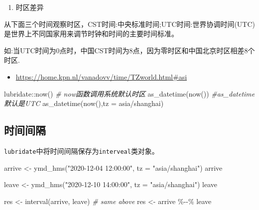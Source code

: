 \documentclass[
]{book}
\newenvironment{Shaded}{\begin{snugshade}}{\end{snugshade}}
\newcommand{\AttributeTok}[1]{\textcolor[rgb]{0.77,0.63,0.00}{#1}}
\newcommand{\CommentTok}[1]{\textcolor[rgb]{0.56,0.35,0.01}{\textit{#1}}}
\newcommand{\FunctionTok}[1]{\textcolor[rgb]{0.00,0.00,0.00}{#1}}
\newcommand{\NormalTok}[1]{#1}
\newcommand{\OtherTok}[1]{\textcolor[rgb]{0.56,0.35,0.01}{#1}}
\newcommand{\SpecialCharTok}[1]{\textcolor[rgb]{0.00,0.00,0.00}{#1}}
\newcommand{\StringTok}[1]{\textcolor[rgb]{0.31,0.60,0.02}{#1}}
\providecommand{\tightlist}{%
  \setlength{\itemsep}{0pt}\setlength{\parskip}{0pt}}
\begin{document}
\begin{enumerate}
\def\labelenumi{\arabic{enumi}.}
\setcounter{enumi}{2}
\tightlist
\item
  时区差异
\end{enumerate}

从下面三个时间观察时区，CST时间:中央标准时间;UTC时间:世界协调时间(UTC)是世界上不同国家用来调节时钟和时间的主要时间标准。

如:当UTC时间为0点时，中国CST时间为8点，因为零时区和中国北京时区相差8个时区.

\begin{itemize}
\tightlist
\item
  \url{https://home.kpn.nl/vanadovv/time/TZworld.html\#asi}
\end{itemize}

\begin{Shaded}
\begin{Highlighting}[]
\NormalTok{lubridate}\SpecialCharTok{::}\FunctionTok{now}\NormalTok{() }\CommentTok{\# now函数调用系统默认时区}
\FunctionTok{as\_datetime}\NormalTok{(}\FunctionTok{now}\NormalTok{()) }\CommentTok{\#as\_datetime默认是UTC}
\FunctionTok{as\_datetime}\NormalTok{(}\FunctionTok{now}\NormalTok{(),}\AttributeTok{tz =} \StringTok{\textquotesingle{}asia/shanghai\textquotesingle{}}\NormalTok{)}
\end{Highlighting}
\end{Shaded}

\hypertarget{ux65f6ux95f4ux95f4ux9694}{%
\subsection{时间间隔}\label{ux65f6ux95f4ux95f4ux9694}}

\texttt{lubridate}中将时间间隔保存为\texttt{interveal}类对象。

\begin{Shaded}
\begin{Highlighting}[]
\NormalTok{arrive }\OtherTok{\textless{}{-}} \FunctionTok{ymd\_hms}\NormalTok{(}\StringTok{"2020{-}12{-}04 12:00:00"}\NormalTok{, }\AttributeTok{tz =} \StringTok{"asia/shanghai"}\NormalTok{)}
\NormalTok{arrive}

\NormalTok{leave }\OtherTok{\textless{}{-}} \FunctionTok{ymd\_hms}\NormalTok{(}\StringTok{"2020{-}12{-}10 14:00:00"}\NormalTok{, }\AttributeTok{tz =} \StringTok{"asia/shanghai"}\NormalTok{)}
\NormalTok{leave}

\NormalTok{res }\OtherTok{\textless{}{-}} \FunctionTok{interval}\NormalTok{(arrive, leave) }
\CommentTok{\# same above}
\NormalTok{res }\OtherTok{\textless{}{-}}\NormalTok{ arrive }\SpecialCharTok{\%{-}{-}\%}\NormalTok{ leave}
\end{Highlighting}
\end{Shaded}
\end{document}
